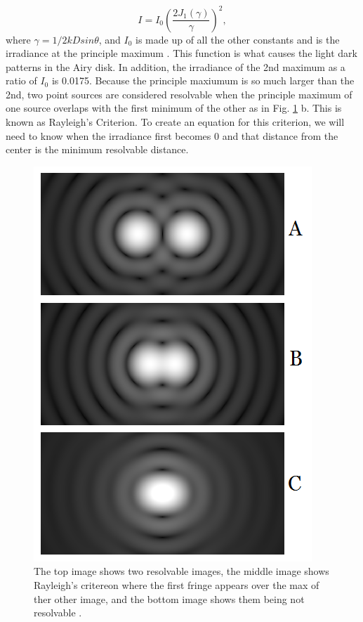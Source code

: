 \documentclass[ notitlepage, numerical, 11pt]{revtex4-1} %
\begin{document}
\begin{equation}
I =  I_0(\frac{2J_1 (\gamma)}{\gamma})^2,
\label{iBessel}
\end{equation} 
where $\gamma = 1/2 k D sin\theta$, and $I_0$ is made up of all the other constants and is the irradiance at the principle maximum \cite{optics}. This function is what causes the light dark patterns in the Airy disk. In addition, the irradiance of the 2nd maximum as a ratio of $I_0$ is 0.0175. Because the principle maxiumum is so much larger than the 2nd, two point sources are considered resolvable when the principle maximum of one source overlaps with the first minimum of the other as in Fig. \ref{criterion} b. This is known as Rayleigh's Criterion. To create an equation for this criterion, we will need to know when the irradiance first becomes 0 and that distance from the center is the minimum resolvable distance. 
\begin{figure}[H]
\centerline{\includegraphics[scale=.45]{criterion.png}}
\caption{The top image shows two resolvable images, the middle image shows Rayleigh's critereon where the first fringe appears over the max of ther other image, and the bottom image shows them being not resolvable \cite{rayleigh}.}
\label{criterion}
\end{figure} 
\end{document}
